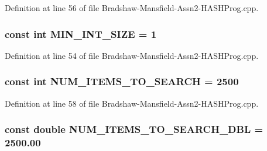 Definition at line 56 of file Bradshaw-\/Mansfield-\/Assn2-\/HASHProg.cpp.

\hypertarget{_bradshaw-_mansfield-_assn2-_h_a_s_h_prog_8cpp_a2e30ee6cd6a71066a4c99da7204c73bd}{
\subsubsection[{MIN\_\-INT\_\-SIZE}]{\setlength{\rightskip}{0pt plus 5cm}const int {\bf MIN\_\-INT\_\-SIZE} = 1}}
\label{_bradshaw-_mansfield-_assn2-_h_a_s_h_prog_8cpp_a2e30ee6cd6a71066a4c99da7204c73bd}


Definition at line 54 of file Bradshaw-\/Mansfield-\/Assn2-\/HASHProg.cpp.

\hypertarget{_bradshaw-_mansfield-_assn2-_h_a_s_h_prog_8cpp_a02ce5f32cab205c8455bd8b976085c50}{
\subsubsection[{NUM\_\-ITEMS\_\-TO\_\-SEARCH}]{\setlength{\rightskip}{0pt plus 5cm}const int {\bf NUM\_\-ITEMS\_\-TO\_\-SEARCH} = 2500}}
\label{_bradshaw-_mansfield-_assn2-_h_a_s_h_prog_8cpp_a02ce5f32cab205c8455bd8b976085c50}


Definition at line 58 of file Bradshaw-\/Mansfield-\/Assn2-\/HASHProg.cpp.

\hypertarget{_bradshaw-_mansfield-_assn2-_h_a_s_h_prog_8cpp_ad619de5a53a38d732b9c5da01523a23e}{
\subsubsection[{NUM\_\-ITEMS\_\-TO\_\-SEARCH\_\-DBL}]{\setlength{\rightskip}{0pt plus 5cm}const double {\bf NUM\_\-ITEMS\_\-TO\_\-SEARCH\_\-DBL} = 2500.00}}
\label{_bradshaw-_mansfield-_assn2-_h_a_s_h_prog_8cpp_ad619de5a53a38d732b9c5da01523a23e}


